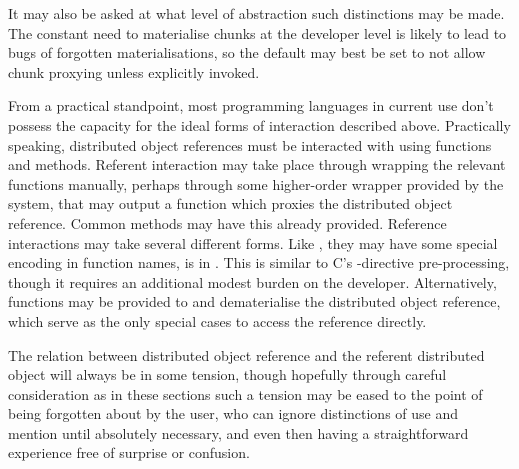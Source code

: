 It may also be asked at what level of abstraction such distinctions may be made.
The constant need to materialise chunks at the developer level is likely to lead to bugs of forgotten materialisations, so the default may best be set to not allow chunk proxying unless explicitly invoked.

From a practical standpoint, most programming languages in current use don't possess the capacity for the ideal forms of interaction described above.
Practically speaking, distributed object references must be interacted with using functions and methods.
Referent interaction may take place through wrapping the relevant functions manually, perhaps through some higher-order wrapper provided by the system, that may output a function which proxies the distributed object reference.
Common methods may have this already provided.
Reference interactions may take several different forms.
Like , they may have some special encoding in function names, is in .
This is similar to C's -directive pre-processing, though it requires an additional modest burden on the developer.
Alternatively, functions may be provided to  and dematerialise the distributed object reference, which serve as the only special cases to access the reference directly.

The relation between distributed object reference and the referent distributed object will always be in some tension, though hopefully through careful consideration as in these sections such a tension may be eased to the point of being forgotten about by the user, who can ignore distinctions of use and mention until absolutely necessary, and even then having a straightforward experience free of surprise or confusion.
